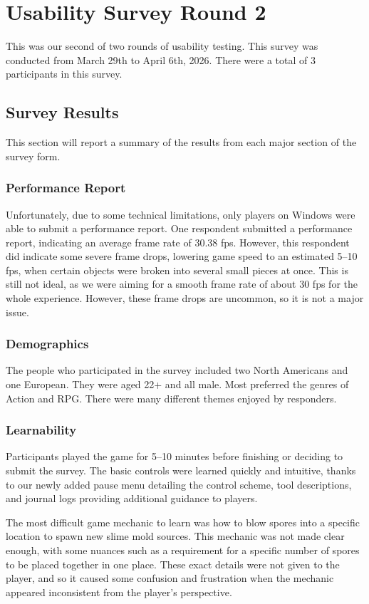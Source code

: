 \documentclass[12pt, titlepage]{article}
\begin{document}
\section{Usability Survey Round 2}
This was our second of two rounds of usability testing.
This survey was conducted from March 29th to April 6th, 2026.
There were a total of 3 participants in this survey.

\subsection{Survey Results}
This section will report a summary of the results from each major section
of the survey form.

\subsubsection{Performance Report}
Unfortunately, due to some technical limitations, only players on Windows 
were able to submit a performance report. One respondent submitted a 
performance report, indicating an average frame rate of 30.38 fps. 
However, this respondent did indicate some severe frame drops, lowering 
game speed to an estimated 5--10 fps, when certain objects were broken 
into several small pieces at once. This is still not ideal, as we were 
aiming for a smooth frame rate of about 30 fps for the whole experience.
However, these frame drops are uncommon, so it is not a major issue.

\subsubsection{Demographics}
The people who participated in the survey included two North
Americans and one European. They were aged 22+ and all male.
Most preferred the genres of Action and RPG. There were many different
themes enjoyed by responders.

\subsubsection{Learnability}
Participants played the game for 5--10 minutes before finishing or deciding 
to submit the survey. The basic controls were learned quickly and intuitive, 
thanks to our newly added pause menu detailing the control scheme, tool 
descriptions, and journal logs providing additional guidance to players.

The most difficult game mechanic to learn was how to blow spores into a 
specific location to spawn new slime mold sources. This mechanic was not 
made clear enough, with some nuances such as a requirement for a specific 
number of spores to be placed together in one place. These exact details 
were not given to the player, and so it caused some confusion and frustration 
when the mechanic appeared inconsistent from the player's perspective.
\end{document}
